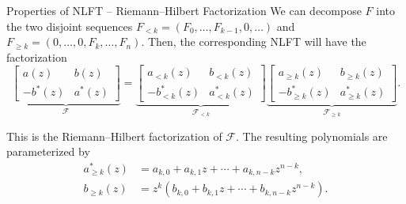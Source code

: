 \begin{frame}{Properties of NLFT -- Riemann--Hilbert Factorization}
    We can decompose $F$ into the two disjoint sequences $F_{<k}=(F_{0},\ldots,F_{k-1},0,\ldots)$ and $F_{\ge k}=(0,\ldots,0,F_k,\ldots,F_{n})$. Then, the corresponding NLFT will have the factorization
    \begin{equation}
        \underbrace{\left[\begin{matrix}
            a(z) & b(z) \\ -b^*(z) & a^*(z)
        \end{matrix}\right]}_{\mathcal{F}} = \underbrace{\left[\begin{matrix}
            a_{<k}(z) & b_{<k}(z) \\ -b_{<k}^*(z) & a_{<k}^*(z)
        \end{matrix}\right]}_{\mathcal{F}_{<k}} \underbrace{\left[\begin{matrix}
            a_{\ge k}(z) & b_{\ge k}(z) \\ -b_{\ge k}^*(z) & a_{\ge k}^*(z)
        \end{matrix}\right]}_{\mathcal{F}_{\ge k}}.
    \end{equation}

    This is the {\color{blue}Riemann--Hilbert factorization} of $\mathcal{F}$.
    The resulting polynomials are parameterized by
    \begin{align}
        a_{\ge k}^*(z) &= a_{k,0} + a_{k,1}z + \cdots + a_{k,n-k}z^{n-k},\\
        b_{\ge k}(z) &= z^k \left(b_{k,0} + b_{k,1}z + \cdots + b_{k,n-k}z^{n-k}\right).
    \end{align}
\end{frame}

